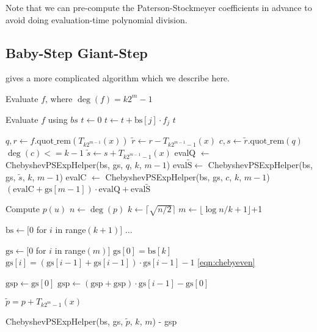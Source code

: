 \documentclass[../fheimpl.tex]{subfiles}
\begin{document}
	Note that we can pre-compute the Paterson-Stockmeyer coefficients in advance to avoid doing evaluation-time polynomial division.
	
	\subsection{Baby-Step Giant-Step}
	\cite{cryptoeprint:2018/1043} gives a more complicated algorithm which we describe here.
	
	\begin{algorithm}
		\caption{Baby-Step/Giant-Step in Chebyshev Basis}\label{alg:chebyBSGS}
		\begin{algorithmic}[1]
			\Comment Evaluate $f$, where $\deg(f)=k2^m-1$
			
			\Comment Evaluate $f$ using $bs$
			\State $t \gets 0$
			\State $t \gets t + \mathrm{bs}[j]\cdot f_j$
			\EndFor
			\State \Return $t$
			\EndIf
			
			\State $q, r \gets f.\text{quot\_rem}(T_{k2^{m-1}}(x))$
			\State $\tilde{r} \gets r - T_{k2^{m-1}-1}(x)$
			\State $c, s \gets \tilde{r}.\text{quot\_rem}(q)$
			\Comment $\deg(c) <= k-1$
			\State $\tilde{s} \gets s + T_{k2^{m-1}-1}(x)$
			\State evalQ $\gets$ ChebyshevPSExpHelper(\textrm{bs}, \textrm{gs}, $q$, $k$, $m-1$)
			\State eval$\tilde{\mathrm{S}}\gets$ ChebyshevPSExpHelper(\textrm{bs}, \textrm{gs}, $\tilde{s}$, $k$, $m-1$)
			\State evalC $\gets$ ChebyshevPSExpHelper(\textrm{bs}, \textrm{gs}, $c$, $k$, $m-1$)
			\State \Return $(\mathrm{evalC} + \mathrm{gs}[m-1])\cdot \mathrm{evalQ} + \mathrm{eval\tilde{S}}$ \label{loc:expcombo}
			\EndProcedure
			\State
			
			
			\Comment Compute $p(u)$
			\State $n \gets \deg(p)$
			\State $k \gets \lceil \sqrt{n/2}\rceil$
			\State $m \gets \lfloor\log{n/k+1}\rfloor$+1
			
			\State $\mathrm{bs} \gets [0$ for $i$ in range$(k+1)]$
			\State $\ldots$
			
			\State $\mathrm{gs} \gets [0$ for $i$ in range$(m)]$
			\State $\mathrm{gs}[0] = \textrm{bs}[k]$
			\State $\mathrm{gs}[i] = (\mathrm{gs}[i-1]+\mathrm{gs}[i-1])\cdot \mathrm{gs}[i-1] - 1$
			\Comment \cref{eqn:chebyeven}
			\EndFor
			
			\State $\mathrm{gsp} \gets \mathrm{gs}[0]$
			\State $\mathrm{gsp} \gets (\mathrm{gsp}+\mathrm{gsp})\cdot \mathrm{gs}[i-1] - \mathrm{gs}[0]$
			\EndFor
			
			\State $\tilde{p} = p + T_{k2^m-1}(x)$
			
			\State \Return \textrm{ChebyshevPSExpHelper}(\textrm{bs}, \textrm{gs}, $\tilde{p}$, $k$, $m$) - \textrm{gsp}
			
			\EndProcedure
		\end{algorithmic}
	\end{algorithm}
	
\end{document}
